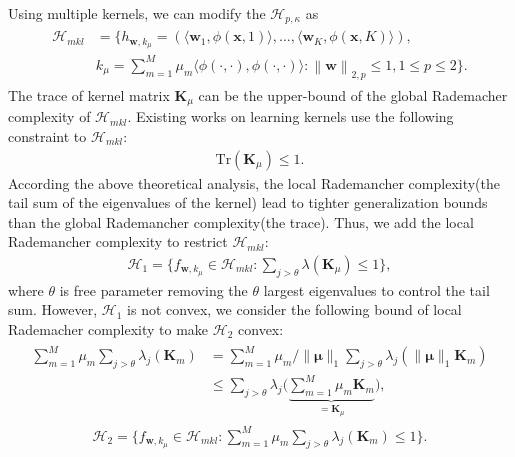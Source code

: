 \documentclass{article}
\begin{document}
Using multiple kernels, we can modify the $\mathcal{H}_{p,\kappa}$ as
 \begin{align}
 \label{hypothspapcemkl}
   \begin{aligned}
   \mathcal{H}_{mkl}&=\Big\{h_{\mathbf{w},k_\mu}=\left(\langle \mathbf w_1,\phi(\mathbf x,1)\rangle,\ldots, \langle\mathbf w_K,\phi(\mathbf x, K)\rangle\right),\\
  &k_\mu=\sum_{m=1}^M \mu_m \langle{\phi(\cdot,\cdot), \phi(\cdot, \cdot)}\rangle: \left\|\mathbf  w \right\|_{2,p}\leq 1, 1\leq p\leq 2
  \Big\}.
   \end{aligned}
 \end{align}
The trace of kernel matrix $\mathbf{K}_\mu$ can be the upper-bound of the global Rademacher complexity of $\mathcal{H}_{mkl}$. Existing works on learning kernels \cite{LanckrietCBGJ02,BachLJ04,SonnenburgRSS06} use the following constraint to $\mathcal{H}_{mkl}$:
\begin{align*}
    \mathrm{Tr}(\mathbf{K}_\mu) \leq 1.
\end{align*}
According the above theoretical analysis, the local Rademancher complexity(the tail sum of the eigenvalues of the kernel) lead to tighter generalization bounds than the global Rademancher complexity(the trace). Thus, we add the local Rademancher complexity to restrict $\mathcal{H}_{mkl}$:
\begin{align}
    \mathcal{H}_{1}=\Big\{f_{\mathbf{w}, k_\mu} \in \mathcal{H}_{mkl}:\sum_{j > \theta} \lambda(\mathbf{K}_\mu) \leq 1\Big\},
\end{align}
where $\theta$ is free parameter removing the $\theta$ largest eigenvalues to control the tail sum.
However, $\mathcal{H}_{1}$ is not convex, we consider the following bound of local Rademacher complexity to make $\mathcal{H}_2$ convex\cite{Cortes2013}:
\begin{align*}
    \begin{aligned}
        \sum_{m=1}^M\mu_m\sum_{j>\theta}\lambda_{j}(\mathbf{K}_m) & =\sum_{m=1}^M\mu_m/\|\mathbf{\mu}\|_1 \sum_{j>\theta}\lambda_{j}(\|\mathbf{\mu}\|_1\mathbf{K}_m)\\
        & \leq \sum_{j>\theta} \lambda_j\Big(\underbrace{\sum_{m=1}^M \mu_m \mathbf{K}_m}_{=\mathbf{K}_\mu}\Big),
    \end{aligned}
\end{align*}
\begin{align}
    \mathcal{H}_{2}=\Big\{f_{\mathbf{w}, k_\mu} \in \mathcal{H}_{mkl}:
    \sum_{m=1}^M\mu_m\sum_{j>\theta}\lambda_{j}(\mathbf{K}_m) \leq 1\Big\}.
\end{align}
\end{document}
